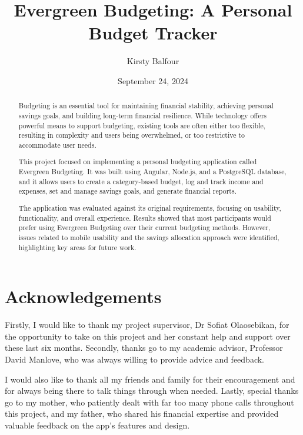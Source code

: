 \documentclass{l4proj}
\begin{document}
\title{Evergreen Budgeting: A Personal Budget Tracker} %
\author{Kirsty Balfour}
\date{September 24, 2024}

\maketitle

\begin{abstract}
    Budgeting is an essential tool for maintaining financial stability, achieving personal savings goals, and building long-term financial resilience. While technology offers powerful means to support budgeting, existing tools are often either too flexible, resulting in complexity and users being overwhelmed, or too restrictive to accommodate user needs.

    This project focused on implementing a personal budgeting application called Evergreen Budgeting. It was built using Angular, Node.js, and a PostgreSQL database, and it allows users to create a category-based budget, log and track income and expenses, set and manage savings goals, and generate financial reports.
    
    The application was evaluated against its original requirements, focusing on usability, functionality, and overall experience. Results showed that most participants would prefer using Evergreen Budgeting over their current budgeting methods. However, issues related to mobile usability and the savings allocation approach were identified, highlighting key areas for future work.
\end{abstract}

\chapter*{Acknowledgements}

Firstly, I would like to thank my project supervisor, Dr Sofiat Olaosebikan, for the opportunity to take on this project and her constant help and support over these last six months. Secondly, thanks go to my academic advisor, Professor David Manlove, who was always willing to provide advice and feedback.

I would also like to thank all my friends and family for their encouragement and for always being there to talk things through when needed. Lastly, special thanks go to my mother, who patiently dealt with far too many phone calls throughout this project, and my father, who shared his financial expertise and provided valuable feedback on the app’s features and design.
\end{document}
